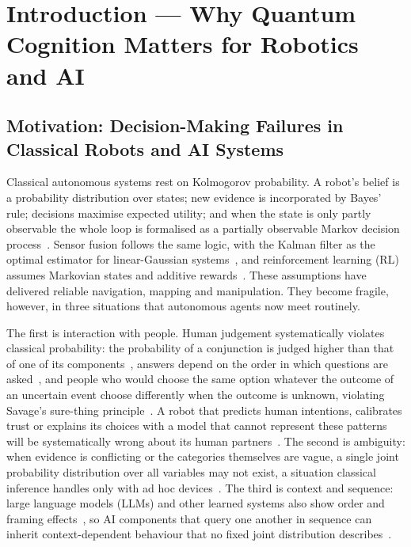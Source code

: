 \documentclass[pdflatex,sn-basic]{sn-jnl}
\newcommand{\surveypart}[1]{\bigskip\noindent{\large\bfseries #1}\par\medskip}
\begin{document}
\maketitle

\surveypart{Part A --- Foundations (Sections 1--4)}

\section{Introduction --- Why Quantum Cognition Matters for Robotics and AI}\label{sec:intro}

\subsection{Motivation: Decision-Making Failures in Classical Robots and AI Systems}\label{sec:motivation}
Classical autonomous systems rest on Kolmogorov probability. A robot's belief is a probability distribution over states; new evidence is incorporated by Bayes' rule; decisions maximise expected utility; and when the state is only partly observable the whole loop is formalised as a partially observable Markov decision process~\citep{Thrun2005,Lauri2023}. Sensor fusion follows the same logic, with the Kalman filter as the optimal estimator for linear-Gaussian systems~\citep{Kalman1960,Haykin2001}, and reinforcement learning (RL) assumes Markovian states and additive rewards~\citep{Sutton2018}. These assumptions have delivered reliable navigation, mapping and manipulation. They become fragile, however, in three situations that autonomous agents now meet routinely.

The first is interaction with people. Human judgement systematically violates classical probability: the probability of a conjunction is judged higher than that of one of its components~\citep{Tversky1983}, answers depend on the order in which questions are asked~\citep{Wang2014}, and people who would choose the same option whatever the outcome of an uncertain event choose differently when the outcome is unknown, violating Savage's sure-thing principle~\citep{Savage1954,Shafir1992}. A robot that predicts human intentions, calibrates trust or explains its choices with a model that cannot represent these patterns will be systematically wrong about its human partners~\citep{Song2022,Roeder2023}. The second is ambiguity: when evidence is conflicting or the categories themselves are vague, a single joint probability distribution over all variables may not exist, a situation classical inference handles only with ad hoc devices~\citep{Ellsberg1961,Blutner2013}. The third is context and sequence: large language models (LLMs) and other learned systems also show order and framing effects~\citep{Binz2023,Tjuatja2024}, so AI components that query one another in sequence can inherit context-dependent behaviour that no fixed joint distribution describes~\citep{Lo2025}.
\end{document}
